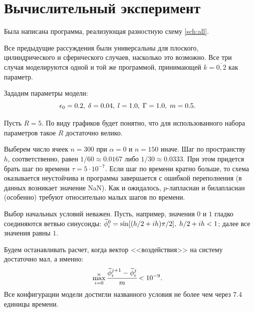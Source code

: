 
\section{Вычислительный эксперимент}

Была написана программа, реализующая разностную схему \eqref{sch:all}.

Все предыдущие рассуждения были универсальны для плоского, цилиндрического и сферического случаев, насколько это возможно. Все три случая моделируются одной и той же программой, принимающей $k = \overline{0, 2}$ как параметр.

Зададим параметры модели:
$$\epsilon_0 = 0.2, \; \delta = 0.04, \; l = 1.0, \; \Gamma = 1.0, \; m = 0.5 {\text{.}}$$

Пусть $R = 5$. По виду графиков будет понятно, что для использованного набора параметров такое $R$ достаточно велико.

Выберем число ячеек $n = 300$ при $\alpha = 0$ и $n = 150$ иначе. Шаг по пространству~$h$, соответственно, равен $1/60 \approx 0.0167$ либо $1/30 \approx 0.0333$. При этом придется брать шаг по времени $\tau = 5 \cdot 10^{-7}$. Если шаг по времени кратно больше, то схема оказывается неустойчива и программа завершается с ошибкой переполнения (в данных возникает значение NaN). Как и ожидалось, $p$-лапласиан и билапласиан (особенно) требуют относительно малых шагов по времени.

Выбор начальных условий неважен. Пусть, например, значения $0$ и $1$ гладко соединяются ветвью синусоиды: ${\widetilde{\phi}}_i^0 = \sin[(h/2 + ih) \pi / 2], \; h/2 + ih < 1$; далее все значения равны $1$.

Будем останавливать расчет, когда вектор <<воздействия>> на систему достаточно мал, а именно:
$$\max\limits_{i = 0}^n \cfrac{{\widetilde{\phi}}_i^{j + 1} - {\widetilde{\phi}}_i^j}{m} < 10^{-9} {\text{.}}$$
Все конфигурации модели достигли названного условия не более чем через $7.4$ единицы времени.

